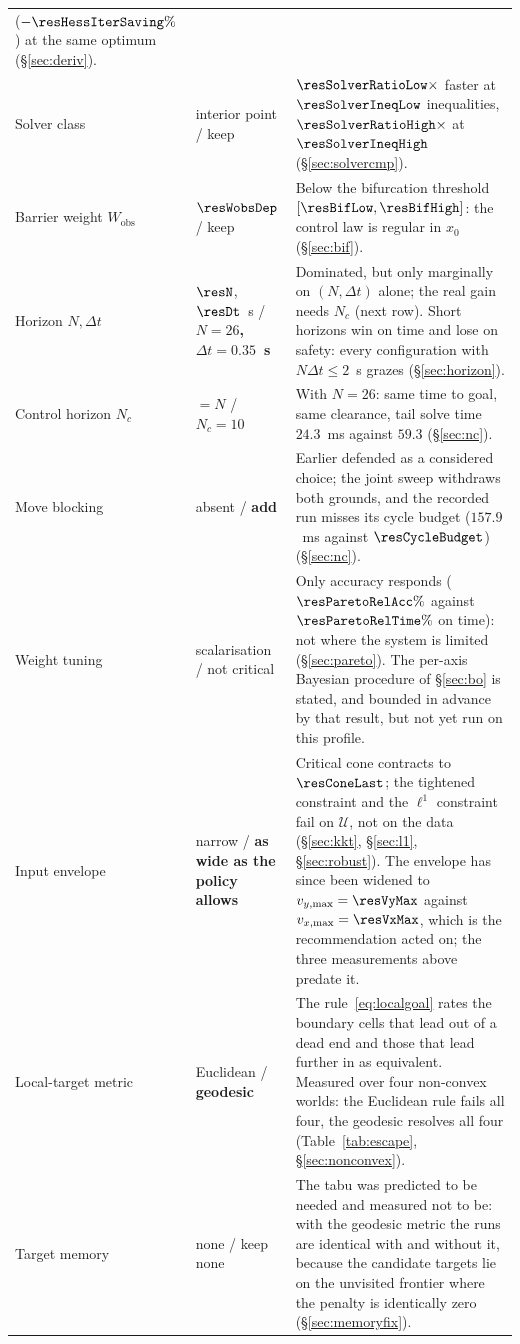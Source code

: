 \documentclass[11pt,a4paper]{article}
\newcommand{\Wobs}{W_{\mathrm{obs}}}
\newcommand{\Ninput}{N_c}
\begin{document}
\begin{table}[htbp]
\begin{tabular}{p{}p{}p{}}
      ($-\resHessIterSaving\%$) at the same optimum (\S\ref{sec:deriv}). \\
    Solver class & interior point / keep & $\resSolverRatioLow\times$ faster at $\resSolverIneqLow$
      inequalities, $\resSolverRatioHigh\times$ at $\resSolverIneqHigh$ (\S\ref{sec:solvercmp}). \\
    Barrier weight $\Wobs$ & $\resWobsDep$ / keep & Below the bifurcation threshold
      $[\resBifLow,\resBifHigh]$: the control law is regular in $x_0$ (\S\ref{sec:bif}). \\
    Horizon $N,\Delta t$ & $\resN$, $\resDt$~s / \textbf{$N=26$, $\Delta t=0.35$~s} & Dominated, but only
      marginally on $(N,\Delta t)$ alone; the real gain needs $\Ninput$ (next row). Short horizons win on
      time and lose on safety: every configuration with $N\Delta t\le2$~s grazes (\S\ref{sec:horizon}). \\
    Control horizon $\Ninput$ & $=N$ / \textbf{$\Ninput=10$} & With $N=26$: same time to goal, same
      clearance, tail solve time $24.3$~ms against $59.3$ (\S\ref{sec:nc}). \\
    Move blocking & absent / \textbf{add} & Earlier defended as a considered choice; the joint sweep
      withdraws both grounds, and the recorded run misses its cycle budget ($157.9$~ms against
      $\resCycleBudget$) (\S\ref{sec:nc}). \\
    Weight tuning & scalarisation / not critical & Only accuracy responds ($\resParetoRelAcc\%$ against
      $\resParetoRelTime\%$ on time): not where the system is limited (\S\ref{sec:pareto}). The per-axis
      Bayesian procedure of \S\ref{sec:bo} is stated, and bounded in advance by that result, but not yet
      run on this profile. \\
    Input envelope & narrow / \textbf{as wide as the policy allows} & Critical cone contracts to
      $\resConeLast$; the tightened constraint and the $\ell^1$ constraint fail on $\mathcal{U}$, not on
      the data (\S\ref{sec:kkt}, \S\ref{sec:l1}, \S\ref{sec:robust}). The envelope has since been
      widened to $v_{y,\max}=\resVyMax$ against $v_{x,\max}=\resVxMax$, which is the recommendation acted
      on; the three measurements above predate it. \\
    Local-target metric & Euclidean / \textbf{geodesic} & The rule~\eqref{eq:localgoal} rates the boundary
      cells that lead out of a dead end and those that lead further in as equivalent. Measured over four
      non-convex worlds: the Euclidean rule fails all four, the geodesic resolves all four
      (Table~\ref{tab:escape}, \S\ref{sec:nonconvex}). \\
    Target memory & none / keep none & The tabu was predicted to be needed and measured not to be: with the
      geodesic metric the runs are identical with and without it, because the candidate targets lie on the
      unvisited frontier where the penalty is identically zero (\S\ref{sec:memoryfix}). \\
    \bottomrule
  \end{tabular}
\end{table}
\end{document}
